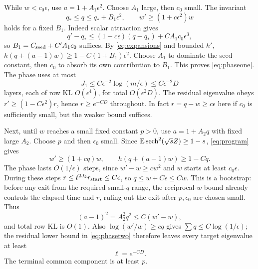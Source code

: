 \documentclass[11pt]{article}
\begin{document}
While $w<c_0\epsilon$, use $a=1+A_1\epsilon^2$. Choose $A_1$ large, then $c_0$ small. The invariant
\begin{equation}\label{eq:phaseone}
 q_*\le q\le q_*+B_1\epsilon^2,\qquad w'\ge(1+c\epsilon^2)w
\end{equation}
holds for a fixed $B_1$. Indeed scalar attraction gives
\[
 q'-q_*\le(1-c\epsilon)(q-q_*)+CA_1c_0\epsilon^3,
\]
so $B_1=C_{\rm seed}+C'A_1c_0$ suffices. By \eqref{eq:expansions} and bounded $h'$, $h(q+(a-1)w)\ge1-C(1+B_1)\epsilon^2$. Choose $A_1$ to dominate the seed constant, then $c_0$ to absorb its own contribution to $B_1$. This proves \eqref{eq:phaseone}. The phase uses at most
\begin{equation}
 J_1\le C\epsilon^{-2}\log(m/\epsilon)\le C\epsilon^{-2}D
\end{equation}
layers, each of row KL $O(\epsilon^4)$, for total $O(\epsilon^2D)$. The residual eigenvalue obeys $r'\ge(1-C\epsilon^2)r$, hence $r\ge e^{-CD}$ throughout. In fact $r=q-w\ge c\epsilon$ here if $c_0$ is sufficiently small, but the weaker bound suffices.

Next, until $w$ reaches a small fixed constant $p>0$, use $a=1+A_2q$ with fixed large $A_2$. Choose $p$ and then $\epsilon_0$ small. Since $\mathbb E\operatorname{sech}^2(\sqrt s Z)\ge1-s$, \eqref{eq:program} gives
\begin{equation}\label{eq:phasetwo}
 w'\ge(1+cq)w,\qquad h(q+(a-1)w)\ge1-Cq.
\end{equation}
The phase lasts $O(1/\epsilon)$ steps, since $w'-w\ge cw^2$ and $w$ starts at least $c_0\epsilon$. During these steps $r\le t^{2J_2}r_{\rm start}\le C\epsilon$, so $q\le w+C\epsilon\le Cw$. This is a bootstrap: before any exit from the required small-$q$ range, the reciprocal-$w$ bound already controls the elapsed time and $r$, ruling out the exit after $p,\epsilon_0$ are chosen small. Thus
\[
 (a-1)^2=A_2^2q^2\le C(w'-w),
\]
and total row KL is $O(1)$. Also $\log(w'/w)\ge cq$ gives $\sum q\le C\log(1/\epsilon)$; the residual lower bound in \eqref{eq:phasetwo} therefore leaves every target eigenvalue at least
\begin{equation}\label{eq:ell}
 \ell=e^{-CD}.
\end{equation}
The terminal common component is at least $p$.
\end{document}
